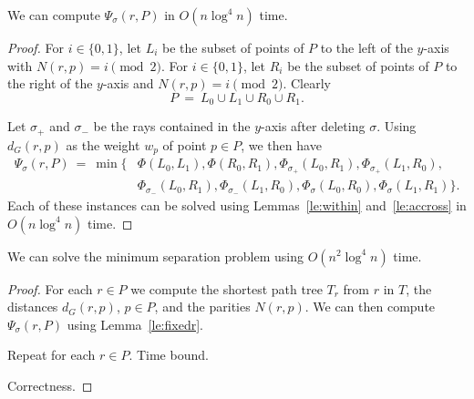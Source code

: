 \documentclass[a4paper,USenglish,numberwithinsect]{lipics}
\begin{document}
\begin{appendix}
\begin{lemma}
\label{le:fixedr}
	We can compute $\Psi_\sigma(r,P)$ in $O(n\log^4 n)$ time.
\end{lemma}
\begin{proof}
	For $i\in \{0,1\}$, let $L_i$ be the subset of points of $P$ to the left of the $y$-axis
	with $N(r,p)=i\pmod 2$.
	For $i\in \{0,1\}$, let $R_i$ be the subset of points of $P$ to the right of the $y$-axis
	and $N(r,p)=i\pmod 2$.
	Clearly
	\[
		P~=~ L_0\cup L_1\cup R_0\cup R_1.
	\]
	
	Let $\sigma_+$ and $\sigma_-$ be the rays contained in the $y$-axis after deleting $\sigma$.
	Using $d_G(r,p)$ as the weight $w_p$ of point $p\in P$, 
	we then have
	\begin{align*}
		 \Psi_\sigma(r,P) ~=~ \min \{ &\Phi( L_0,L_1), \Phi( R_0,R_1),
										\Phi_{\sigma_+}( L_0,R_1), \Phi_{\sigma_+}( L_1,R_0),\\
										&\Phi_{\sigma_-}( L_0,R_1), \Phi_{\sigma_-}( L_1,R_0),
										\Phi_{\sigma}( L_0,R_0), \Phi_{\sigma}(L_1,R_1) \}.
	\end{align*}
	Each of these instances can be solved using Lemmas~\ref{le:within} and~\ref{le:accross} in
	$O(n\log^4 n)$ time.
\end{proof}


\begin{theorem}
	We can solve the minimum separation problem using $O(n^2\log^4 n)$ time.
\end{theorem}
\begin{proof}
	For each $r\in P$ we compute the shortest path tree $T_r$ from $r$ in $T$,
	the distances $d_G(r,p)$, $p\in P$, and the parities $N(r,p)$.
	We can then compute $\Psi_\sigma(r,P)$ using Lemma~\ref{le:fixedr}.
	
	Repeat for each $r\in P$.
	Time bound.
	
	Correctness.
	
\end{proof}


\end{appendix}
\end{document}
